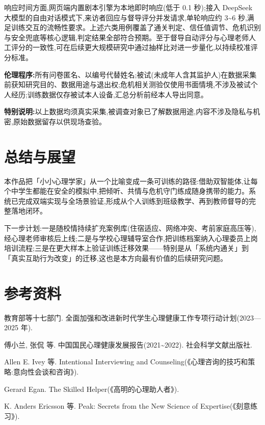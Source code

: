 \documentclass[zihao=-4, a4paper]{ctexart}
\begin{document}
\noindent 响应时间方面,网页端内置剧本引擎为本地即时响应(低于 0.1 秒);接入 DeepSeek 大模型的自由对话模式下,来访者回应与督导评分并发请求,单轮响应约 3\textasciitilde6 秒,满足训练交互的流畅性要求。上述六类用例覆盖了通关判定、信任值调节、危机识别与安全兜底等核心逻辑,判定结果全部符合预期。至于督导自动评分与心理老师人工评分的一致性,可在后续更大规模研究中通过抽样比对进一步量化,以持续校准评分标准。

\noindent\textbf{伦理程序:}所有问卷匿名、以编号代替姓名;被试(未成年人含其监护人)在数据采集前获知研究目的、数据用途与退出权;危机相关测验仅使用书面情境,不涉及被试个人经历;训练数据仅存被试本人设备,汇总分析前经本人导出同意。

\vspace{4pt}
\noindent\textbf{特别说明:}以上数据均须真实采集,被调查对象已了解数据用途,内容不涉及隐私与机密,原始数据留存以供现场查验。

\section{总结与展望}
本作品把「小小心理学家」从一个比喻变成一条可训练的路径:借助双智能体,让每个中学生都能在安全的模拟中,把倾听、共情与危机守门练成随身携带的能力。系统已完成双端实现与全场景验证,形成从个人训练到班级教学、再到教师督导的完整落地闭环。

下一步计划:一是随校情持续扩充案例库(住宿适应、网络冲突、考前家庭高压等),经心理老师审核后上线;二是与学校心理辅导室合作,把训练档案纳入心理委员上岗培训流程;三是在更大样本上验证训练迁移效果——特别是从「系统内通关」到「真实互助行为改变」的迁移,这也是本方向最有价值的后续研究问题。

\section*{参考资料}
\small
\begin{enumerate}[leftmargin=2.2em, itemsep=1pt, label={[\arabic*]}]
\item 教育部等十七部门. 全面加强和改进新时代学生心理健康工作专项行动计划(2023—2025 年).
\item 傅小兰, 张侃 等. 中国国民心理健康发展报告(2021\textasciitilde2022). 社会科学文献出版社.
\item Allen E. Ivey 等. Intentional Interviewing and Counseling(《心理咨询的技巧和策略:意向性会谈和咨询》).
\item Gerard Egan. The Skilled Helper(《高明的心理助人者》).
\item K. Anders Ericsson 等. Peak: Secrets from the New Science of Expertise(《刻意练习》).
\end{enumerate}
\end{document}
